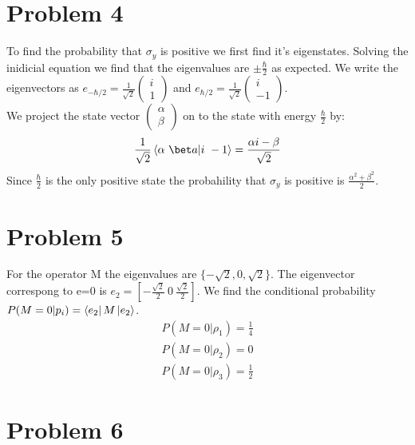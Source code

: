 \documentclass[a4paper,12pt]{article}
\numberwithin{equation}{section}
\begin{document}
\section{Problem 4}
To find the probability that $\sigma_y$ is positive we first find it's eigenstates.
Solving the inidicial equation we find that the eigenvalues are $\pm\frac{\hbar}{2}$ as expected.
We write the eigenvectors as $e_{-\hbar/2}=\frac{1}{\sqrt{2}}\left( \begin{smallmatrix}i\\1\end{smallmatrix} \right)$
and $e_{\hbar/2}=\frac{1}{\sqrt{2}}\left( \begin{smallmatrix}i\\-1\end{smallmatrix} \right)$.\\
We project the state vector $\left( \begin{smallmatrix}\alpha\\ \beta \end{smallmatrix} \right)$ 
on to the state with energy $\frac{\hbar}{2}$ by:
\begin{gather}
 \frac{1}{\sqrt{2}}\braket{\alpha\ \bet a | i\ -1}=\frac{\alpha i-\beta}{\sqrt{2}}
\end{gather}
Since $\frac{\hbar}{2}$ is the only positive state the probahility that $\sigma_y$ is positive is $\frac{\alpha^2+\beta^2}{2}$.

\section{Problem 5}
For the operator M the eigenvalues are $\{-\sqrt{2}, 0, \sqrt{2} \}$.
The eigenvector correspong to e=0 is $e_2=[-\frac{\sqrt{2}}{2}\ 0\ \frac{\sqrt{2}}{2}]$.
We find the conditional probability $P(M=0|p_i)=\bra{e_2}M\ket{e_2}$.\\
\begin{gather}
 P(M=0| \rho_1)=\frac{1}{4}\\
 P(M=0| \rho_2)=0\\
 P(M=0| \rho_3)=\frac{1}{2}
\end{gather}

\section{Problem 6}
\end{document}
